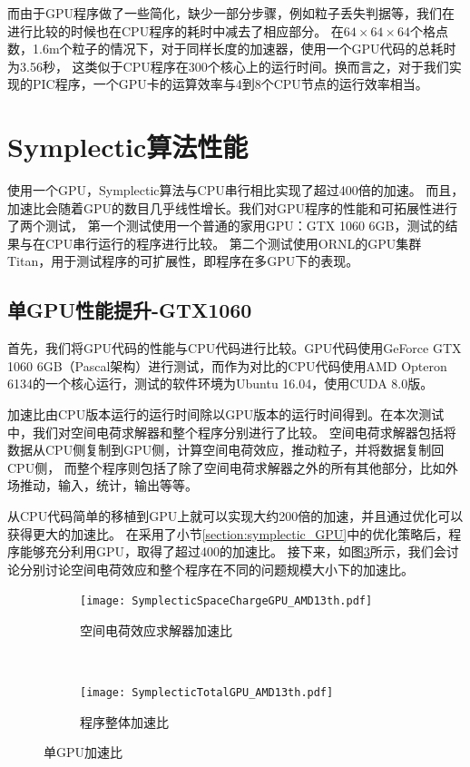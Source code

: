 而由于GPU程序做了一些简化，缺少一部分步骤，例如粒子丢失判据等，我们在进行比较的时候也在CPU程序的耗时中减去了相应部分。
在$64 \times 64 \times 64$个格点数，1.6m个粒子的情况下，对于同样长度的加速器，使用一个GPU代码的总耗时为3.56秒，
这类似于CPU程序在300个核心上的运行时间。换而言之，对于我们实现的PIC程序，一个GPU卡的运算效率与4到8个CPU节点的运行效率相当。


\section{Symplectic算法性能}        \label{section:Symplectic_performance}
使用一个GPU，Symplectic算法与CPU串行相比实现了超过400倍的加速。
而且，加速比会随着GPU的数目几乎线性增长。我们对GPU程序的性能和可拓展性进行了两个测试，
第一个测试使用一个普通的家用GPU：GTX 1060 6GB，测试的结果与在CPU串行运行的程序进行比较。
第二个测试使用ORNL的GPU集群Titan，用于测试程序的可扩展性，即程序在多GPU下的表现。

\subsection{单GPU性能提升-GTX1060}
首先，我们将GPU代码的性能与CPU代码进行比较。GPU代码使用GeForce GTX 1060 6GB（Pascal架构）进行测试，而作为对比的CPU代码使用AMD Opteron 6134的一个核心运行，测试的软件环境为Ubuntu 16.04，使用CUDA 8.0版。

加速比由CPU版本运行的运行时间除以GPU版本的运行时间得到。在本次测试中，我们对空间电荷求解器和整个程序分别进行了比较。
空间电荷求解器包括将数据从CPU侧复制到GPU侧，计算空间电荷效应，推动粒子，并将数据复制回CPU侧，
而整个程序则包括了除了空间电荷求解器之外的所有其他部分，比如外场推动，输入，统计，输出等等。

从CPU代码简单的移植到GPU上就可以实现大约200倍的加速，并且通过优化可以获得更大的加速比。
在采用了小节\ref{section:symplectic_GPU}中的优化策略后，程序能够充分利用GPU，取得了超过400的加速比。
接下来，如图\ref{fig:OneGPU}所示，我们会讨论分别讨论空间电荷效应和整个程序在不同的问题规模大小下的加速比。

\begin{figure}[!htb]
    \centering
    \begin{subfigure}[b]{0.9\textwidth}
        \texttt{[image: SymplecticSpaceChargeGPU\_AMD13th.pdf]}
        \caption{空间电荷效应求解器加速比}
        \label{fig:SCOpt}
    \end{subfigure}
    \quad
    ~ %
    \begin{subfigure}[b]{0.9\textwidth}
        \texttt{[image: SymplecticTotalGPU\_AMD13th.pdf]}
        \caption{程序整体加速比}
        \label{fig:TotalOpt}
    \end{subfigure}
    \caption{单GPU加速比}\label{fig:OneGPU}
\end{figure}

